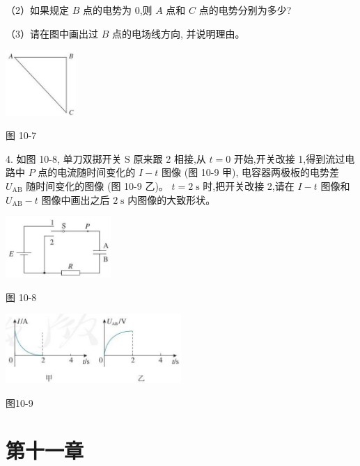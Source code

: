 \documentclass[10pt]{article}
\begin{document}
（2）如果规定 \(B\) 点的电势为 0,则 \(A\) 点和 \(C\) 点的电势分别为多少?

（3）请在图中画出过 \(B\) 点的电场线方向, 并说明理由。

\begin{center}
\includegraphics[max width=0.2\textwidth]{images/01911d5f-8e38-70c0-b5b8-2b399bd115b6_56_507392.jpg}
\end{center}

图 10-7

4. 如图 10-8, 单刀双掷开关 \(\mathrm{S}\) 原来跟 2 相接,从 \(t = 0\) 开始,开关改接 1,得到流过电路中 \(P\) 点的电流随时间变化的 \(I - t\) 图像 (图 10-9 甲), 电容器两极板的电势差 \({U}_{\mathrm{{AB}}}\) 随时间变化的图像 (图 10-9 乙)。 \(t = 2\mathrm{\;s}\) 时,把开关改接 2,请在 \(I - t\) 图像和 \({U}_{\mathrm{{AB}}} - t\) 图像中画出之后 \(2\mathrm{\;s}\) 内图像的大致形状。

\begin{center}
\includegraphics[max width=0.3\textwidth]{images/01911d5f-8e38-70c0-b5b8-2b399bd115b6_56_282853.jpg}
\end{center}

图 10-8

\begin{center}
\includegraphics[max width=0.5\textwidth]{images/01911d5f-8e38-70c0-b5b8-2b399bd115b6_56_650560.jpg}
\end{center}

图10-9

\section*{第十一章}
\end{document}
